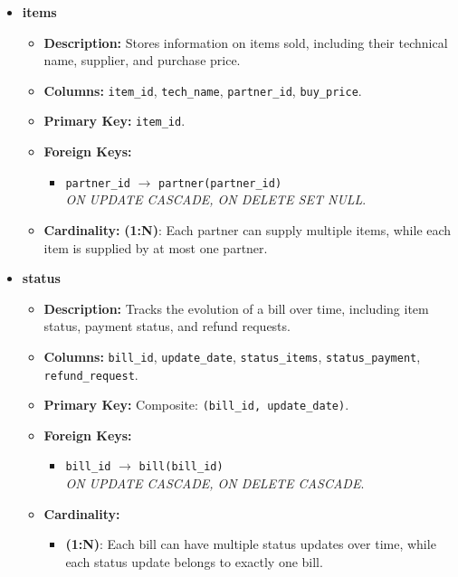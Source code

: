 \documentclass[12pt,a4paper]{article}
\begin{document}
\begin{itemize}
   \item \textbf{items}
    \begin{itemize}
        \item \textbf{Description:} Stores information on items sold, including their technical name, supplier, and purchase price.
        \item \textbf{Columns:} \texttt{item\_id}, \texttt{tech\_name}, \texttt{partner\_id}, \texttt{buy\_price}.
        \item \textbf{Primary Key:} \texttt{item\_id}.
        \item \textbf{Foreign Keys:}
        \begin{itemize}
            \item \texttt{partner\_id} $\to$ \texttt{partner(partner\_id)} \\
            \hspace{1cm} \textit{ON UPDATE CASCADE, ON DELETE SET NULL}.
        \end{itemize}
        \item \textbf{Cardinality:} \textbf{(1:N)}: Each partner can supply multiple items, while each item is supplied by at most one partner.
    \end{itemize}
        \item \textbf{status}
    \begin{itemize}
        \item \textbf{Description:} Tracks the evolution of a bill over time, including item status, payment status, and refund requests.
        \item \textbf{Columns:} \texttt{bill\_id}, \texttt{update\_date}, \texttt{status\_items}, \texttt{status\_payment}, \texttt{refund\_request}.
        \item \textbf{Primary Key:} Composite: \texttt{(bill\_id, update\_date)}.
        \item \textbf{Foreign Keys:} 
        \begin{itemize}
            \item \texttt{bill\_id} $\to$ \texttt{bill(bill\_id)} \\
            \hspace{1cm} \textit{ON UPDATE CASCADE, ON DELETE CASCADE}.
        \end{itemize}
        \item \textbf{Cardinality:}
        \begin{itemize}
            \item \textbf{(1:N)}: Each bill can have multiple status updates over time, while each status update belongs to exactly one bill.
        \end{itemize}
    \end{itemize}


\end{itemize}
\end{document}
